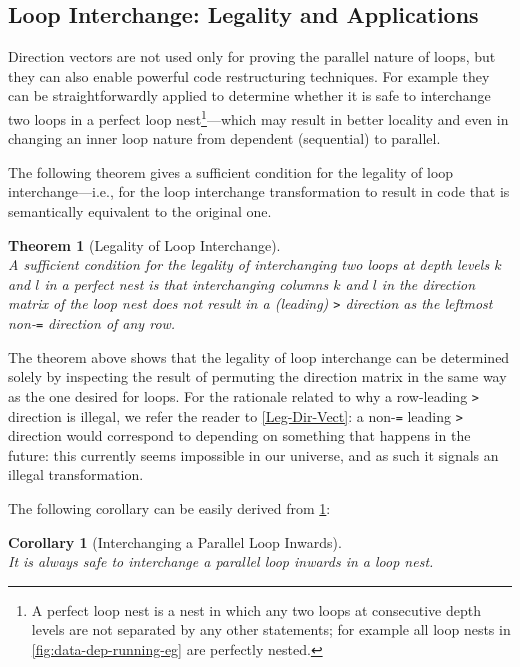 \documentclass[acmsmall,review]{acmart}\settopmatter{printfolios=true,printccs=false,printacmref=false}
\newtheorem{mytheo}{Theorem}
\newtheorem{mycorol}{Corollary}
\begin{document}
\subsection{Loop Interchange: Legality and Applications}
\label{subsec:loop-interch}

Direction vectors are not used only for proving the parallel
nature of loops, but they can also enable powerful code
restructuring techniques. For example they can be 
straightforwardly applied to determine whether it is safe
to interchange two loops in a perfect loop nest\footnote{
A perfect loop nest is a nest in which any two loops at
consecutive depth levels are not separated by any other 
statements; for example all loop nests in 
\cref{fig:data-dep-running-eg} are perfectly nested.
}---which may result in better locality and even in changing
an inner loop nature from dependent (sequential) to parallel.

The following theorem gives a sufficient condition for the
legality of loop interchange---i.e., for the loop interchange
transformation to result in code that is semantically equivalent 
to the original one.


\begin{mytheo}[Legality of Loop Interchange]\label{Loop-Interch}
$\mbox{ }$\\
A sufficient condition for the legality of interchanging 
two loops at depth levels $k$ and $l$ in a perfect nest 
is that interchanging columns $k$ and $l$ in the direction 
matrix of the loop nest {\em does not result} in a (leading)
{\tt>} direction as the leftmost non-{\tt=} direction 
of any row.
\end{mytheo}

The theorem above shows that the legality of loop interchange
can be determined solely by inspecting the result of permuting
the direction matrix in the same way as the one desired for loops.
For the rationale related to why a row-leading {\tt>} direction
is illegal, we refer the reader to \cref{Leg-Dir-Vect}: a non-{\tt=}
leading {\tt>} direction would correspond to depending on something
that happens in the future: this currently seems impossible in our
universe, and as such it signals an illegal transformation.

The following corollary can be easily derived from \cref{Loop-Interch}:
\begin{mycorol}[Interchanging a Parallel Loop Inwards]\label{Par-Loop-Interch}
$\mbox{ }$\\
It is always safe to interchange a {\em parallel loop} inwards in a loop nest.
\end{mycorol}
\end{document}
